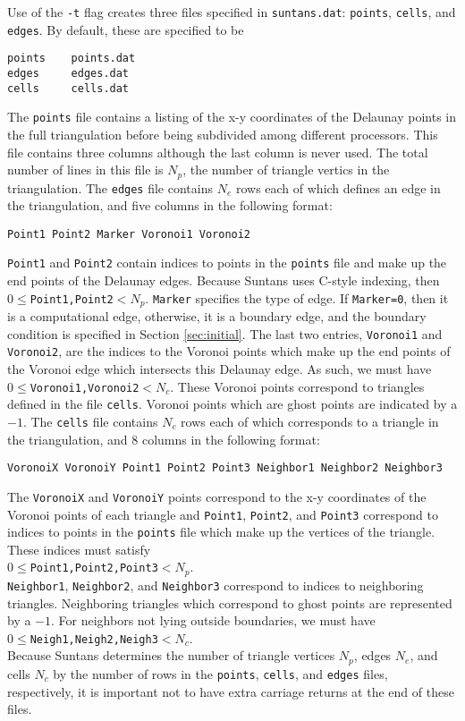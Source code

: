 \documentclass[12pt,oneside]{article}
\begin{document}
Use of the \verb+-t+ flag creates three files specified in \verb+suntans.dat+: 
\verb+points+, \verb+cells+, and \verb+edges+.  By default, these are specified
to be
\begin{verbatim}
points    points.dat
edges     edges.dat
cells     cells.dat
\end{verbatim}
The \verb+points+ file contains a listing of the x-y coordinates of the Delaunay points
in the full triangulation before being subdivided among different processors. 
This file contains three columns although the last column is never used.  The
total number of lines in this file is $N_p$, the number of triangle vertics in the triangulation.
The \verb+edges+ file contains $N_e$ rows each of which defines an
edge in the triangulation, and five columns in the following format:
\begin{verbatim}
Point1 Point2 Marker Voronoi1 Voronoi2
\end{verbatim}
\verb+Point1+ and \verb+Point2+ contain indices to points in the \verb+points+ file
and make up the end points of the Delaunay edges.  Because Suntans uses C-style
indexing, then $0\le$\verb+Point1,Point2+$<N_p$.  \verb+Marker+ specifies the type
of edge.  If \verb+Marker=0+, then it is a computational edge, otherwise, it is
a boundary edge, and the boundary condition is specified in Section \ref{sec:initial}.
The last two entries, \verb+Voronoi1+ and \verb+Voronoi2+, are the indices to the Voronoi
points which make up the end points of the Voronoi edge which intersects this Delaunay edge.
As such, we must have $0\le$\verb+Voronoi1,Voronoi2+$<N_c$.
These Voronoi points correspond to triangles defined in the file \verb+cells+.  Voronoi points
which are ghost points are indicated by a $-1$.
The \verb+cells+ file contains $N_c$ rows each of which corresponds to a
triangle in the triangulation, and 8 columns in the following format:
\begin{verbatim}
VoronoiX VoronoiY Point1 Point2 Point3 Neighbor1 Neighbor2 Neighbor3
\end{verbatim}
The \verb+VoronoiX+ and \verb+VoronoiY+ points correspond to the x-y coordinates
of the Voronoi points of each triangle and \verb+Point1+, \verb+Point2+, and \verb+Point3+
correspond to indices to points in the \verb+points+ file which make up the
vertices of the triangle.  These indices must satisfy \\
$0\le$\verb+Point1,Point2,Point3+$<N_p$. \\
\verb+Neighbor1+, \verb+Neighbor2+, and
\verb+Neighbor3+ correspond to indices to neighboring triangles.  Neighboring
triangles which correspond to ghost points are represented by a $-1$.  For neighbors
not lying outside boundaries, we must have \\
$0\le$\verb+Neigh1,Neigh2,Neigh3+$<N_c$.\\
Because Suntans determines the number of triangle vertices $N_p$, edges $N_e$, and cells $N_c$
by the number of rows in the \verb+points+, \verb+cells+, and \verb+edges+ files, respectively,
it is important not to have extra carriage returns at the end of these files.
\end{document}
